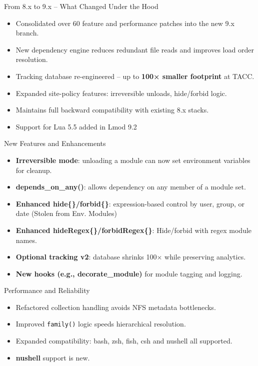 \documentclass[aspectratio=169]{beamer}
\begin{document}
\begin{frame}{From 8.x to 9.x – What Changed Under the Hood}
  \begin{itemize}
    \item Consolidated over 60 feature and performance patches into the new 9.x branch.
    \item New dependency engine reduces redundant file reads and improves load order resolution.
    \item Tracking database re-engineered – up to \textbf{100× smaller footprint} at TACC.
    \item Expanded site-policy features: irreversible unloads, hide/forbid logic.
    \item Maintains full backward compatibility with existing 8.x
      stacks.
    \item Support for Lua 5.5 added in Lmod 9.2
  \end{itemize}
\end{frame}

\begin{frame}{New Features and Enhancements}
  \begin{itemize}
    \item \textbf{Irreversible mode}: unloading a module can now set environment variables for cleanup.
    \item \textbf{depends\_on\_any()}: allows dependency on any member of a module set.
    \item \textbf{Enhanced hide\{\}/forbid\{\}}: expression-based
      control by user, group, or date (Stolen from Env. Modules)
    \item \textbf{Enhanced hideRegex\{\}/forbidRegex\{\}}: Hide/forbid
      with regex module names.
    \item \textbf{Optional tracking v2}: database shrinks 100× while preserving analytics.
    \item \textbf{New hooks (e.g., decorate\_module)} for module tagging and logging.
  \end{itemize}
\end{frame}



\begin{frame}{Performance and Reliability}
  \begin{itemize}
    \item Refactored collection handling avoids NFS metadata bottlenecks.
    \item Improved \texttt{family()} logic speeds hierarchical resolution.
    \item Expanded compatibility: bash, zsh, fish, csh and nushell all supported.
    \item \textbf{nushell} support is new.
  \end{itemize}
\end{frame}
\end{document}
